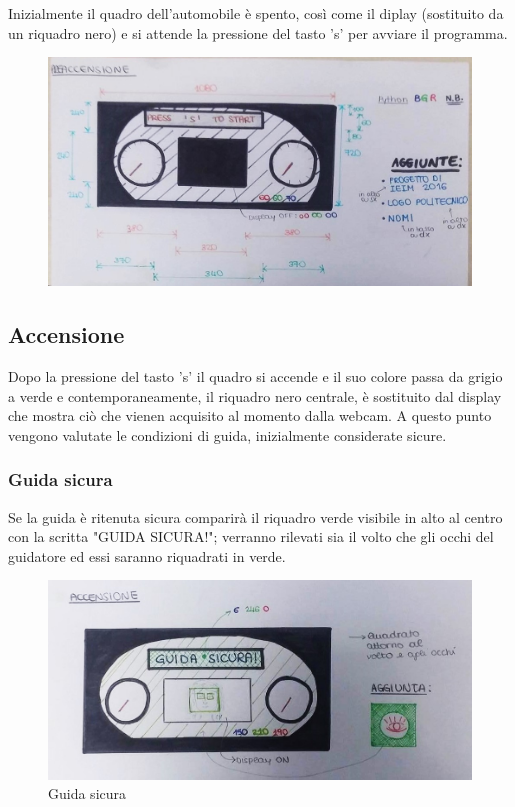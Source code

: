 \documentclass[12pt]{article}
\begin{document}
	Inizialmente il quadro dell'automobile \`{e} spento, così come il diplay (sostituito da un riquadro nero) e si attende la pressione del tasto 's' per avviare il programma.
	
		\begin{figure}
\centering
\includegraphics[width=0.7\linewidth]{../Assets/Img/1.jpg}
\caption{}
\label{fig:1}
\end{figure}


		
	\subsection{Accensione}
	
	Dopo la pressione del tasto 's' il quadro si accende e il suo colore passa da grigio a verde e contemporaneamente, il riquadro nero centrale, \`{e} sostituito dal display che mostra ciò che vienen acquisito al momento dalla webcam. A questo punto vengono valutate le condizioni di guida, inizialmente considerate sicure.
	
	\subsubsection{Guida sicura}
	
	Se la guida \`{e} ritenuta sicura comparir\`{a} il riquadro verde visibile in alto al centro con la scritta "GUIDA SICURA!"; verranno rilevati sia il volto che gli occhi del guidatore ed essi saranno riquadrati in verde.
	
		\begin{figure}[H]
			\centering
			\includegraphics[width=1.0\linewidth]{../Assets/Img/2.jpg}
			\caption{Guida sicura}
			\label{fig:2}
		\end{figure}
\end{document}
